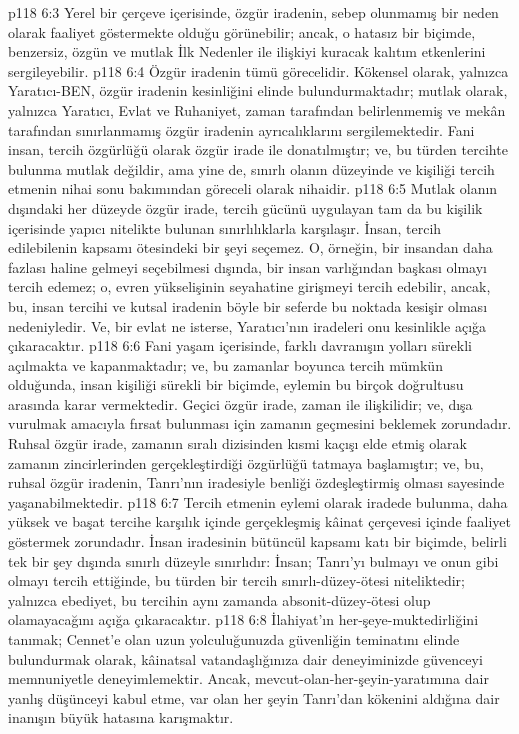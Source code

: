 \vs p118 6:3 Yerel bir çerçeve içerisinde, özgür iradenin, sebep olunmamış bir neden olarak faaliyet göstermekte olduğu görünebilir; ancak, o hatasız bir biçimde, benzersiz, özgün ve mutlak İlk Nedenler ile ilişkiyi kuracak kalıtım etkenlerini sergileyebilir.
\vs p118 6:4 Özgür iradenin tümü görecelidir. Kökensel olarak, yalnızca Yaratıcı\hyp{}BEN, özgür iradenin kesinliğini elinde bulundurmaktadır; mutlak olarak, yalnızca Yaratıcı, Evlat ve Ruhaniyet, zaman tarafından belirlenmemiş ve mekân tarafından sınırlanmamış özgür iradenin ayrıcalıklarını sergilemektedir. Fani insan, tercih özgürlüğü olarak özgür irade ile donatılmıştır; ve, bu türden tercihte bulunma mutlak değildir, ama yine de, sınırlı olanın düzeyinde ve kişiliği tercih etmenin nihai sonu bakımından göreceli olarak nihaidir.
\vs p118 6:5 Mutlak olanın dışındaki her düzeyde özgür irade, tercih gücünü uygulayan tam da bu kişilik içerisinde yapıcı nitelikte bulunan sınırlılıklarla karşılaşır. İnsan, tercih edilebilenin kapsamı ötesindeki bir şeyi seçemez. O, örneğin, bir insandan daha fazlası haline gelmeyi seçebilmesi dışında, bir insan varlığından başkası olmayı tercih edemez; o, evren yükselişinin seyahatine girişmeyi tercih edebilir, ancak, bu, insan tercihi ve kutsal iradenin böyle bir seferde bu noktada kesişir olması nedeniyledir. Ve, bir evlat ne isterse, Yaratıcı’nın iradeleri onu kesinlikle açığa çıkaracaktır.
\vs p118 6:6 Fani yaşam içerisinde, farklı davranışın yolları sürekli açılmakta ve kapanmaktadır; ve, bu zamanlar boyunca tercih mümkün olduğunda, insan kişiliği sürekli bir biçimde, eylemin bu birçok doğrultusu arasında karar vermektedir. Geçici özgür irade, zaman ile ilişkilidir; ve, dışa vurulmak amacıyla fırsat bulunması için zamanın geçmesini beklemek zorundadır. Ruhsal özgür irade, zamanın sıralı dizisinden kısmi kaçışı elde etmiş olarak zamanın zincirlerinden gerçekleştirdiği özgürlüğü tatmaya başlamıştır; ve, bu, ruhsal özgür iradenin, Tanrı’nın iradesiyle benliği özdeşleştirmiş olması sayesinde yaşanabilmektedir.
\vs p118 6:7 Tercih etmenin eylemi olarak iradede bulunma, daha yüksek ve başat tercihe karşılık içinde gerçekleşmiş kâinat çerçevesi içinde faaliyet göstermek zorundadır. İnsan iradesinin bütüncül kapsamı katı bir biçimde, belirli tek bir şey dışında sınırlı düzeyle sınırlıdır: İnsan; Tanrı’yı bulmayı ve onun gibi olmayı tercih ettiğinde, bu türden bir tercih sınırlı\hyp{}düzey\hyp{}ötesi niteliktedir; yalnızca ebediyet, bu tercihin aynı zamanda absonit\hyp{}düzey\hyp{}ötesi olup olamayacağını açığa çıkaracaktır.
\vs p118 6:8 İlahiyat’ın her\hyp{}şeye\hyp{}muktedirliğini tanımak; Cennet’e olan uzun yolculuğunuzda güvenliğin teminatını elinde bulundurmak olarak, kâinatsal vatandaşlığınıza dair deneyiminizde güvenceyi memnuniyetle deneyimlemektir. Ancak, mevcut\hyp{}olan\hyp{}her\hyp{}şeyin\hyp{}yaratımına dair yanlış düşünceyi kabul etme, var olan her şeyin Tanrı’dan kökenini aldığına dair inanışın büyük hatasına karışmaktır.
